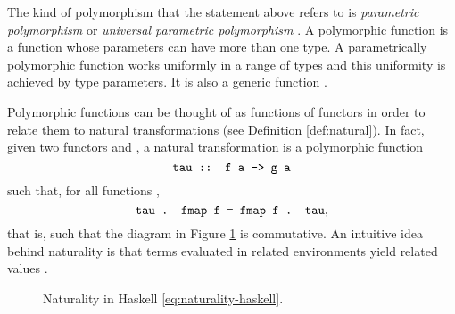 
The kind of polymorphism that the statement above refers to is
\emph{parametric polymorphism}
\parencite[following][37]{strachey-2000} or \emph{universal parametric
  polymorphism} \parencite[following][4]{cardelli-1985}. A polymorphic
function is a function whose parameters can have more than one type. A
parametrically polymorphic function works uniformly in a range of
types and this uniformity is achieved by type parameters. It is also a
generic function \parencite[4, 5]{cardelli-1985}.

Polymorphic functions can be thought of as functions of functors in order
to relate them to natural transformations (see Definition \ref{def:natural}).
In fact, given two functors  and , a
natural transformation  is a polymorphic function
\begin{equation}
  \label{eq:natural-haskell-a}
  \text{\texttt{tau :: f a -> g a}}
\end{equation}
such that, for all functions ,
\begin{equation}
  \label{eq:naturality-haskell}
  \text{\texttt{tau . fmap f = fmap f . tau}}
  \text{,}
\end{equation}
that is, such that the diagram in Figure \ref{fig:naturality-haskell}
is commutative. An intuitive idea behind naturality is that terms
evaluated in related environments yield related values
\parencite[347--348]{wadler-1989}.
\begin{figure}[htbp]
  \begin{center}
  \end{center}
  \caption{Naturality in Haskell \eqref{eq:naturality-haskell}.}
  \label{fig:naturality-haskell}
\end{figure}

